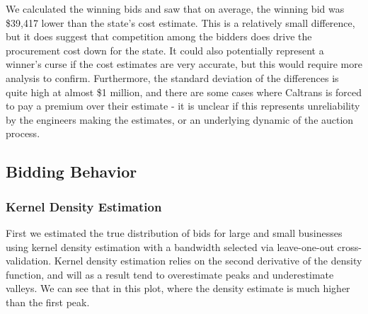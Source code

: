We calculated the winning bids and saw that on average, the winning bid was
\$39,417 lower than the state's cost estimate. This is a relatively small
difference, but it does suggest that competition among the bidders does drive
the procurement cost down for the state. It could also potentially
represent a winner's curse if the cost estimates are very accurate,
but this would require more analysis to confirm.
Furthermore, the standard deviation of the differences is quite high
at almost \$1 million, and there are some cases where Caltrans
is forced to pay a premium over their estimate - it is unclear if this
represents unreliability by the engineers making the estimates,
or an underlying dynamic of the auction process.

\subsection{Bidding Behavior}

%

\subsubsection{Kernel Density Estimation}

First we estimated the true distribution of bids for large and
small businesses using kernel density estimation with a bandwidth
selected via leave-one-out cross-validation.
Kernel density estimation relies on the second derivative of the
density function, and will as a result tend to overestimate peaks and
underestimate valleys. We can see that in this plot, where
the density estimate is much higher than the first peak.

